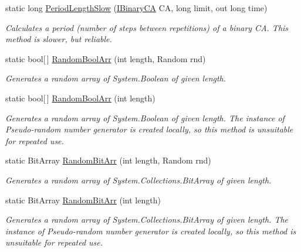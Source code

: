 \begin{DoxyCompactItemize}
static long \hyperlink{class_cellular_1_1_utilities_aa0b71d2f39b127f7078a35263adbfd55}{Period\+Length\+Slow} (\hyperlink{interface_cellular_1_1_i_binary_c_a}{I\+Binary\+C\+A} C\+A, long limit, out long time)
\begin{DoxyCompactList}\small\item\em Calculates a period (number of steps between repetitions) of a binary C\+A. This method is slower, but reliable. \end{DoxyCompactList}\item 
static bool\mbox{[}$\,$\mbox{]} \hyperlink{class_cellular_1_1_utilities_a3f20fa274e0db626d4052fe233f7a00f}{Random\+Bool\+Arr} (int length, Random rnd)
\begin{DoxyCompactList}\small\item\em Generates a random array of {\ttfamily System.\+Boolean} of given length. \end{DoxyCompactList}\item 
static bool\mbox{[}$\,$\mbox{]} \hyperlink{class_cellular_1_1_utilities_a069e9224bbd6f305d17e38d6290424cd}{Random\+Bool\+Arr} (int length)
\begin{DoxyCompactList}\small\item\em Generates a random array of {\ttfamily System.\+Boolean} of given length. The instance of Pseudo-\/random number generator is created locally, so this method is unsuitable for repeated use. \end{DoxyCompactList}\item 
static Bit\+Array \hyperlink{class_cellular_1_1_utilities_a887bbf207bece7f1bfa93d3d3fab547d}{Random\+Bit\+Arr} (int length, Random rnd)
\begin{DoxyCompactList}\small\item\em Generates a random array of {\ttfamily System.\+Collections.\+Bit\+Array} of given length. \end{DoxyCompactList}\item 
static Bit\+Array \hyperlink{class_cellular_1_1_utilities_a9cf5e2901915830e230c8affacfcec18}{Random\+Bit\+Arr} (int length)
\begin{DoxyCompactList}\small\item\em Generates a random array of {\ttfamily System.\+Collections.\+Bit\+Array} of given length. The instance of Pseudo-\/random number generator is created locally, so this method is unsuitable for repeated use. \end{DoxyCompactList}\end{DoxyCompactItemize}


